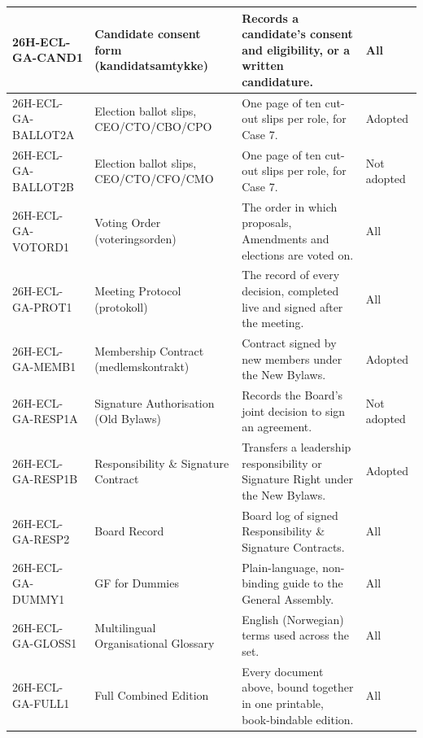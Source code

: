 \documentclass{../../../Common/Latex/Templates/rapport}
\begin{document}
\begin{longtable}{|L{3.2cm}|L{3.6cm}|L{5.3cm}|L{1.9cm}|}
  \hline
  26H-ECL-GA-CAND1   & Candidate consent form (kandidatsamtykke)       & Records a candidate's consent and eligibility, or a written candidature.                      & All \\
  \hline
  26H-ECL-GA-BALLOT2A & Election ballot slips, CEO/CTO/CBO/CPO         & One page of ten cut-out slips per role, for Case 7.                                           & Adopted \\
  \hline
  26H-ECL-GA-BALLOT2B & Election ballot slips, CEO/CTO/CFO/CMO         & One page of ten cut-out slips per role, for Case 7.                                           & Not adopted \\
  \hline
  26H-ECL-GA-VOTORD1 & Voting Order (voteringsorden)                   & The order in which proposals, Amendments and elections are voted on.                          & All \\
  \hline
  26H-ECL-GA-PROT1   & Meeting Protocol (protokoll)                    & The record of every decision, completed live and signed after the meeting.                    & All \\
  \hline
  26H-ECL-GA-MEMB1   & Membership Contract (medlemskontrakt)           & Contract signed by new members under the New Bylaws.                                          & Adopted \\
  \hline
  26H-ECL-GA-RESP1A  & Signature Authorisation (Old Bylaws)            & Records the Board's joint decision to sign an agreement.                                      & Not adopted \\
  \hline
  26H-ECL-GA-RESP1B  & Responsibility \& Signature Contract            & Transfers a leadership responsibility or Signature Right under the New Bylaws.                & Adopted \\
  \hline
  26H-ECL-GA-RESP2   & Board Record                                    & Board log of signed Responsibility \& Signature Contracts.                                     & All \\
  \hline
  26H-ECL-GA-DUMMY1  & GF for Dummies                                  & Plain-language, non-binding guide to the General Assembly.                                    & All \\
  \hline
  26H-ECL-GA-GLOSS1  & Multilingual Organisational Glossary            & English (Norwegian) terms used across the set.                                                & All \\
  \hline
  26H-ECL-GA-FULL1   & Full Combined Edition                           & Every document above, bound together in one printable, book-bindable edition.                 & All \\
  \hline
\end{longtable}
\endgroup
\end{document}
